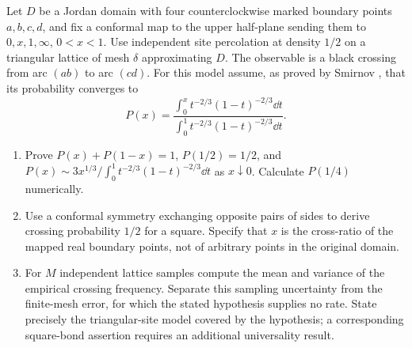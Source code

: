 \begin{exercise}
Let $D$ be a Jordan domain with four counterclockwise marked
boundary points $a,b,c,d$, and fix a conformal map to the
upper half-plane sending them to $0,x,1,\infty$, $0<x<1$.
Use independent site percolation at density $1/2$ on a
triangular lattice of mesh $\delta$ approximating $D$.
The observable is a black crossing from arc $(ab)$ to
arc $(cd)$. For this model assume, as proved by Smirnov
\cite{smirnov-percolation}, that its probability converges to
\[
 P(x)=\frac{\displaystyle\int_0^x
                  t^{-2/3}(1-t)^{-2/3}\dd t}
             {\displaystyle\int_0^1
                  t^{-2/3}(1-t)^{-2/3}\dd t}.
\]
\begin{enumerate}[label=(\alph*)]
\item Prove $P(x)+P(1-x)=1$, $P(1/2)=1/2$, and
$P(x)\sim3x^{1/3}/\int_0^1t^{-2/3}(1-t)^{-2/3}\dd t$
as $x\downarrow0$. Calculate $P(1/4)$ numerically.
\item Use a conformal symmetry exchanging opposite pairs
of sides to derive crossing probability $1/2$ for a square.
Specify that $x$ is the cross-ratio of the mapped real
boundary points, not of arbitrary points in the original domain.
\item For $M$ independent lattice samples compute the mean
and variance of the empirical crossing frequency.
Separate this sampling uncertainty from the finite-mesh
error, for which the stated hypothesis supplies no rate.
State precisely the triangular-site model covered by the
hypothesis; a corresponding square-bond assertion requires
an additional universality result.
\end{enumerate}
\end{exercise}
